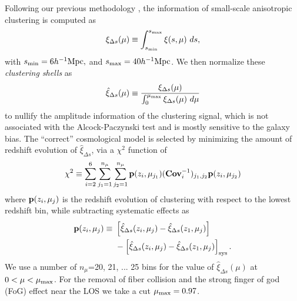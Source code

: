 \documentclass[iop]{emulateapj}
\begin{document}
Following our previous methodology \citep{Li2016}, the information of small-scale anisotropic clustering is computed as 
\begin{equation}
\xi_{\Delta s} (\mu) \equiv \int_{s_{\rm min}}^{s_{\rm max}} \xi (s,\mu)\ ds,
\end{equation}
with $s_{\rm min}=6 h^{-1} {\rm Mpc},$ and $s_{\rm max}=40 h^{-1} {\rm Mpc}$.
We then normalize these {\em clustering shells} as 
\begin{equation}
\hat\xi_{\Delta s}(\mu) \equiv \frac{\xi_{\Delta s}(\mu)}{\int_{0}^{\mu_{\rm max}}\xi_{\Delta s}(\mu)\ d\mu}
\end{equation}
to nullify the amplitude information of the clustering signal, 
which is not associated with the Alcock-Paczynski test and is mostly sensitive to the galaxy bias.
The ``correct'' cosmological model is selected by minimizing the amount of redshift evolution of $\hat\xi_{\Delta s}$,
via a $\chi^2$ function of 
\begin{equation}
 \chi^2\equiv \sum_{i=2}^{6} \sum_{j_1=1}^{n_{\mu}} \sum_{j_2=1}^{n_{\mu}} {\bf p}(z_i,\mu_{j_1}) ({\bf Cov}_{i}^{-1})_{j_1,j_2}  {\bf p}(z_i,\mu_{j_2})
\end{equation}
where ${\bf p}(z_i,\mu_{j})$ is the redshift evolution of clustering with respect to the lowest redshift bin,
while subtracting systematic effects as
\begin{eqnarray}
 {\bf p}(z_i,\mu_{j}) \equiv\ & \left[\hat\xi_{\Delta s}(z_i,\mu_j)-\hat\xi_{\Delta s}(z_1,\mu_j)\right] \\ \nonumber
 &- \left[\hat\xi_{\Delta s}(z_i,\mu_j)-\hat\xi_{\Delta s}(z_1,\mu_j)\right]_{\rm sys}.
\end{eqnarray}
We use a number of $n_{\mu}$=20, 21, ... 25 bins for the value of $\hat\xi_{\Delta s}(\mu)$ at $0<\mu<\mu_{\rm max}$.
For the removal of fiber collision and the strong finger of god (FoG) effect \citep{FOG} near the LOS we take a cut $\mu_{\rm max} = 0.97$.
\end{document}
